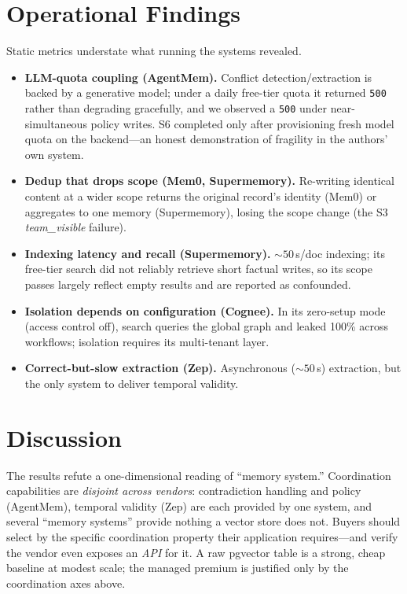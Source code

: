 \documentclass[11pt]{article}
\begin{document}
\section{Operational Findings}\label{sec:operational}
Static metrics understate what running the systems revealed.
\begin{itemize}
  \item \textbf{LLM-quota coupling (AgentMem).} Conflict detection/extraction is
  backed by a generative model; under a daily free-tier quota it returned \texttt{500}
  rather than degrading gracefully, and we observed a \texttt{500} under
  near-simultaneous policy writes. S6 completed only after provisioning fresh model
  quota on the backend---an honest demonstration of fragility in the authors' own
  system.
  \item \textbf{Dedup that drops scope (Mem0, Supermemory).} Re-writing identical
  content at a wider scope returns the original record's identity (Mem0) or aggregates
  to one memory (Supermemory), losing the scope change (the S3 \emph{team\_visible}
  failure).
  \item \textbf{Indexing latency and recall (Supermemory).} ${\sim}50$\,s/doc indexing;
  its free-tier search did not reliably retrieve short factual writes, so its scope
  passes largely reflect empty results and are reported as confounded.
  \item \textbf{Isolation depends on configuration (Cognee).} In its zero-setup mode
  (access control off), search queries the global graph and leaked 100\% across
  workflows; isolation requires its multi-tenant layer.
  \item \textbf{Correct-but-slow extraction (Zep).} Asynchronous (${\sim}50$\,s)
  extraction, but the only system to deliver temporal validity.
\end{itemize}

\section{Discussion}
The results refute a one-dimensional reading of ``memory system.'' Coordination
capabilities are \emph{disjoint across vendors}: contradiction handling and policy
(AgentMem), temporal validity (Zep) are each provided by one system, and several
``memory systems'' provide nothing a vector store does not. Buyers should select by
the specific coordination property their application requires---and verify the vendor
even exposes an \emph{API} for it. A raw pgvector table is a strong, cheap baseline at
modest scale; the managed premium is justified only by the coordination axes above.
\end{document}
